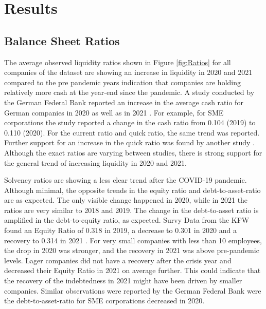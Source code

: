 
\chapter{Results} %

\label{Chapter5} %


\section{Balance Sheet Ratios}

The average observed liquidity ratios shown in Figure \ref{fig:Ratios} for all companies of the dataset are showing an increase in liquidity in 2020 and 2021 compared to the pre pandemic years indication that companies are holding relatively more cash at the year-end since the pandemic. A study conducted by the German Federal Bank reported an increase in the average cash ratio for German companies in 2020 as well as in 2021 \parencite{deutsche_bundesbank_jahresabschlussstatistik_2022}. For example, for SME corporations the study reported a change in the cash ratio from 0.104 (2019) to 0.110 (2020). For the current ratio and quick ratio, the same trend was reported. Further support for an increase in the quick ratio was found by another study \parencite{bley_mittelstand_2022}. Although the exact ratios are varying between studies, there is strong support for the general trend of increasing liquidity in 2020 and 2021.

Solvency ratios are showing a less clear trend after the COVID-19 pandemic. Although minimal, the opposite trends in the equity ratio and debt-to-asset-ratio are as expected. The only visible change happened in 2020, while in 2021 the ratios are very similar to 2018 and 2019. The change in the debt-to-asset ratio is amplified in the debt-to-equity ratio, as expected. Survy Data from the KFW found an Equity Ratio of 0.318 in 2019, a decrease to 0.301 in 2020 and a recovery to 0.314 in 2021 \parencite{kfw_kfw-mittelstandspanel_2022}. For very small companies with less than 10 employees, the drop in 2020 was stronger, and the recovery in 2021 was above pre-pandemic levels. Lager companies did not have a recovery after the crisis year and decreased their Equity Ratio in 2021 on average further. This could indicate that the recovery of the indebtedness in 2021 might have been driven by smaller companies. Similar observations were reported by the German Federal Bank were the debt-to-asset-ratio for SME corporations decreased in 2020.


